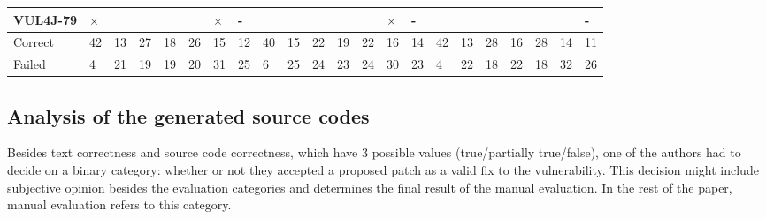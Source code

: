 \begin{table}[!htbp]
{\begin{tabular}{|l|lll|ll|ll||lll|ll|ll||lll|ll|ll|}
		\href{https://github.com/zeroturnaround/zt-zip/commit/759b72f33bc8f4d69f84f09fcb7f010ad45d6fff}{VUL4J-79} & \cellcolor{red}$\times$ & \cellcolor{yellow}\halfcheckmark & \cellcolor{green}\checkmark & \cellcolor{green}\checkmark & \cellcolor{green}\checkmark & \cellcolor{red}$\times$ & \cellcolor{lightgray}-  & \cellcolor{green}\checkmark & 
		\cellcolor{yellow}\halfcheckmark & \cellcolor{green}\checkmark & \cellcolor{green}\checkmark & \cellcolor{green}\checkmark & \cellcolor{red}$\times$ & \cellcolor{lightgray}-     & \cellcolor{green}\checkmark & \cellcolor{green}\checkmark & \cellcolor{green}\checkmark & \cellcolor{green}\checkmark & \cellcolor{green}\checkmark & \cellcolor{green}\checkmark & \cellcolor{lightgray}-\\ 
		\hline
		Correct & 42 & 13 & 27 & 18 & 26 & 15 & 12 & 40 & 15 & 22 & 19 & 22 & 16 & 14 & 42 & 13 & 28 & 16 & 28 & 14 & 11\\
		Failed & 4 & 21 & 19 & 19 & 20 & 31 & 25 & 6 & 25 & 24 & 23 & 24 & 30 & 23 & 4 & 22 & 18 & 22 & 18 & 32 & 26\\\hline
	\end{tabular}
}
	\label{tab:sum}

\end{table}


\subsection{Analysis of the generated source codes}

Besides text correctness and source code correctness, which have 3 possible values (true/partially true/false), one of the authors had to decide on a binary category: whether or not they accepted a proposed patch as a valid fix to the vulnerability.
This decision might include subjective opinion besides the evaluation categories and determines the final result of the manual evaluation.
In the rest of the paper, manual evaluation refers to this category.

